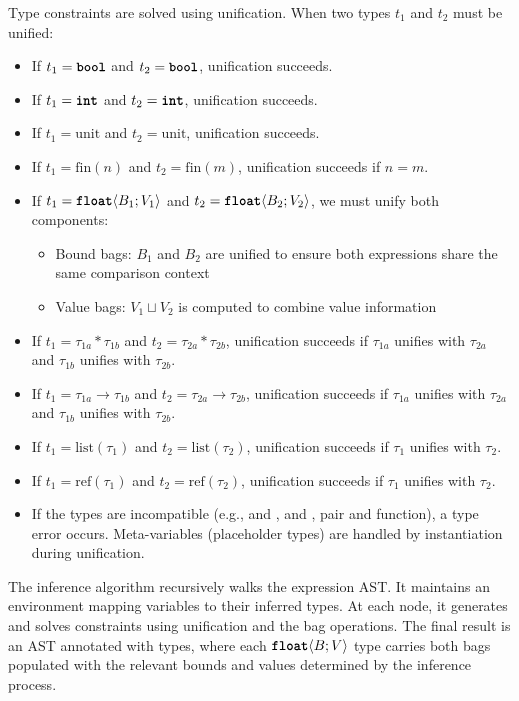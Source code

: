 Type constraints are solved using unification. When two types $t_1$ and $t_2$ must be unified:
\begin{itemize}
    \item If $t_1 = \text{\ttfamily\bfseries bool}$ and $t_2 = \text{\ttfamily\bfseries bool}$, unification succeeds.
    \item If $t_1 = \text{\ttfamily\bfseries int}$ and $t_2 = \text{\ttfamily\bfseries int}$, unification succeeds.
    \item If $t_1 = \text{unit}$ and $t_2 = \text{unit}$, unification succeeds.
    \item If $t_1 = \text{fin}(n)$ and $t_2 = \text{fin}(m)$, unification succeeds if $n = m$.
    \item If $t_1 = \text{\ttfamily\bfseries float}\langle B_1; V_1 \rangle$ and $t_2 = \text{\ttfamily\bfseries float}\langle B_2; V_2 \rangle$, we must unify both components:
        \begin{itemize}
            \item Bound bags: $B_1$ and $B_2$ are unified to ensure both expressions share the same comparison context
            \item Value bags: $V_1 \sqcup V_2$ is computed to combine value information
        \end{itemize}
    \item If $t_1 = \tau_{1a} * \tau_{1b}$ and $t_2 = \tau_{2a} * \tau_{2b}$, unification succeeds if $\tau_{1a}$ unifies with $\tau_{2a}$ and $\tau_{1b}$ unifies with $\tau_{2b}$.
    \item If $t_1 = \tau_{1a} \rightarrow \tau_{1b}$ and $t_2 = \tau_{2a} \rightarrow \tau_{2b}$, unification succeeds if $\tau_{1a}$ unifies with $\tau_{2a}$ and $\tau_{1b}$ unifies with $\tau_{2b}$.
    \item If $t_1 = \text{list}(\tau_1)$ and $t_2 = \text{list}(\tau_2)$, unification succeeds if $\tau_1$ unifies with $\tau_2$.
    \item If $t_1 = \text{ref}(\tau_1)$ and $t_2 = \text{ref}(\tau_2)$, unification succeeds if $\tau_1$ unifies with $\tau_2$.
    \item If the types are incompatible (e.g., \bool{} and \float{}, \intty{} and \float{}, pair and function), a type error occurs. Meta-variables (placeholder types) are handled by instantiation during unification.
\end{itemize}

The inference algorithm recursively walks the expression AST. It maintains an environment mapping variables to their inferred types. At each node, it generates and solves constraints using unification and the bag operations. The final result is an AST annotated with types, where each $\text{\ttfamily\bfseries float}\langle B; V \rangle$ type carries both bags populated with the relevant bounds and values determined by the inference process.

